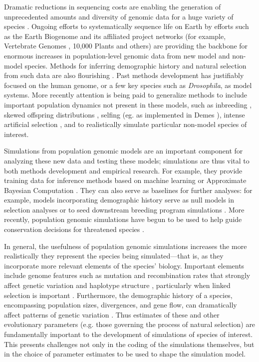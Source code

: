 \documentclass[hidelinks]{article}
\begin{document}
Dramatic reductions in sequencing costs are enabling the generation of
unprecedented amounts and diversity of genomic data for a huge variety of species
\citep{Ellegren2014}. Ongoing efforts to systematically sequence life on
Earth by efforts such as the Earth Biogenome \citep{Lewin2022} and its
affiliated project networks (for example, Vertebrate Genomes
\citep{Rhie2021}, 10,000 Plants \citep{Cheng2018} and others) are
providing the backbone for enormous increases in population-level genomic data from
new model and non-model species. Methods for inferring
demographic history and natural selection from such data are also flourishing
\citep{Beichman2018}. Past methods development has justifiably focused on the
human genome, or a few key species such as \emph{Drosophila}, 
as model systems. More recently attention is being paid to
generalize methods to include important population dynamics not present
in these models, such as inbreeding \citep{Blischak2020}, skewed offspring
distributions \citep{Montano2016}, selfing (eg. as implemented in Demes
\citep{Gower2022}), intense artificial selection \citep{MacLeod2013,
MacLeod2014}, and to realistically simulate particular non-model species of interest.

Simulations from population genomic models are an important component
for analyzing these new data and testing these models; 
simulations are thus vital to both methods
development and empirical research. For example, they provide training
data for inference methods based on machine learning \citep{Schrider2018} or
Approximate Bayesian Computation \citep{Csillery2010}. They can also serve as
baselines for further analyses: for example, models incorporating
demographic history serve as null models in selection analyses
\citep{Hsieh2016a} or to seed downstream breeding program simulations
\citep{Gaynor2020}. More recently, population genomic simulations have begun
to be used to help guide conservation decisions for threatened species
\citep{Teixeira2021}.

In general, the usefulness of population genomic simulations increases
the more realistically they represent the species being simulated---that
is, as they incorporate more relevant elements of the species' biology. Important
elements include genome features such as mutation and recombination
rates that strongly affect genetic variation and haplotype structure
\citep{Nachman2002}, particularly when linked selection is important \citep{Cutter2013}. 
Furthermore, the demographic history of a
species, encompassing population sizes, divergences, and gene flow, can
dramatically affect patterns of genetic variation \citep{Teshima2006}. Thus
estimates of these and other evolutionary parameters (e.g. those governing
the process of natural selection) are fundamentally important to the
development of simulations of species of interest. This presents
challenges not only in the coding of the simulations themselves, but in
the choice of parameter estimates to be used to shape the simulation
model.
\end{document}
